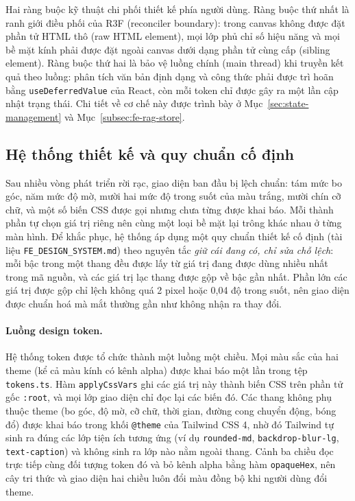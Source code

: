 Hai ràng buộc kỹ thuật chi phối thiết kế phía người dùng. Ràng buộc thứ nhất là ranh giới điều phối của R3F (reconciler boundary): trong canvas không được đặt phần tử HTML thô (raw HTML element), mọi lớp phủ chỉ số hiệu năng và mọi bề mặt kính phải được đặt ngoài canvas dưới dạng phần tử cùng cấp (sibling element). Ràng buộc thứ hai là bảo vệ luồng chính (main thread) khi truyền kết quả theo luồng: phân tích văn bản định dạng và công thức phải được trì hoãn bằng \texttt{useDeferredValue} của React, còn mỗi token chỉ được gây ra một lần cập nhật trạng thái. Chi tiết về cơ chế này được trình bày ở Mục~\ref{sec:state-management} và Mục~\ref{subsec:fe-rag-store}.

\subsection{Hệ thống thiết kế và quy chuẩn cố định}
\label{subsec:design-system}

Sau nhiều vòng phát triển rời rạc, giao diện ban đầu bị lệch chuẩn: tám mức bo góc, năm mức độ mờ, mười hai mức độ trong suốt của màu trắng, mười chín cỡ chữ, và một số biến CSS được gọi nhưng chưa từng được khai báo. Mỗi thành phần tự chọn giá trị riêng nên cùng một loại bề mặt lại trông khác nhau ở từng màn hình. Để khắc phục, hệ thống áp dụng một quy chuẩn thiết kế cố định (tài liệu \texttt{FE\_DESIGN\_SYSTEM.md}) theo nguyên tắc \emph{giữ cái đang có, chỉ sửa chỗ lệch}: mỗi bậc trong một thang đều được lấy từ giá trị đang được dùng nhiều nhất trong mã nguồn, và các giá trị lạc thang được gộp về bậc gần nhất. Phần lớn các giá trị được gộp chỉ lệch không quá 2 pixel hoặc 0,04 độ trong suốt, nên giao diện được chuẩn hoá mà mắt thường gần như không nhận ra thay đổi.

\paragraph{Luồng design token.} Hệ thống token được tổ chức thành một luồng một chiều. Mọi màu sắc của hai theme (kể cả màu kính có kênh alpha) được khai báo một lần trong tệp \texttt{tokens.ts}. Hàm \texttt{applyCssVars} ghi các giá trị này thành biến CSS trên phần tử gốc \texttt{:root}, và mọi lớp giao diện chỉ đọc lại các biến đó. Các thang không phụ thuộc theme (bo góc, độ mờ, cỡ chữ, thời gian, đường cong chuyển động, bóng đổ) được khai báo trong khối \texttt{@theme} của Tailwind CSS 4, nhờ đó Tailwind tự sinh ra đúng các lớp tiện ích tương ứng (ví dụ \texttt{rounded-md}, \texttt{backdrop-blur-lg}, \texttt{text-caption}) và không sinh ra lớp nào nằm ngoài thang. Cảnh ba chiều đọc trực tiếp cùng đối tượng token đó và bỏ kênh alpha bằng hàm \texttt{opaqueHex}, nên cây tri thức và giao diện hai chiều luôn đổi màu đồng bộ khi người dùng đổi theme.

